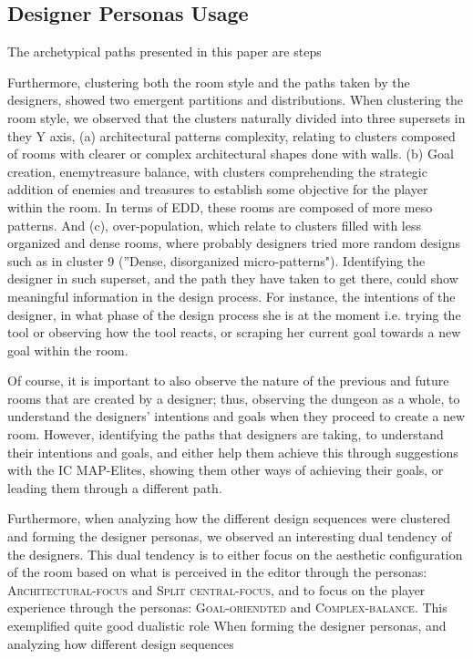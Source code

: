 \subsection{Designer Personas Usage}

The archetypical paths presented in this paper are steps 

Furthermore, clustering both the room style and the paths taken by the designers, showed two emergent partitions and distributions. When clustering the room style, we observed that the clusters naturally divided into three supersets in they Y axis, (a) architectural patterns complexity, relating to clusters composed of rooms with clearer or complex architectural shapes done with walls. (b) Goal creation, enemy\/treasure balance, with clusters comprehending the strategic addition of enemies and treasures to establish some objective for the player within the room. In terms of EDD, these rooms are composed of more meso patterns. And (c), over-population, which relate to clusters filled with less organized and dense rooms, where probably designers tried more random designs such as in cluster 9 (''Dense, disorganized micro-patterns"). Identifying the designer in such superset, and the path they have taken to get there, could show meaningful information in the design process. For instance, the intentions of the designer, in what phase of the design process she is at the moment i.e. trying the tool or observing how the tool reacts, or scraping her current goal towards a new goal within the room. 

Of course, it is important to also observe the nature of the previous and future rooms that are created by a designer; thus, observing the dungeon as a whole, to understand the designers' intentions and goals when they proceed to create a new room. However, identifying the paths that designers are taking, to understand their intentions and goals, and either help them achieve this through suggestions with the IC MAP-Elites, showing them other ways of achieving their goals, or leading them through a different path.

Furthermore, when analyzing how the different design sequences were clustered and forming the designer personas, we observed an interesting dual tendency of the designers. This dual tendency is to either focus on the aesthetic configuration of the room based on what is perceived in the editor through the personas: \textsc{Architectural-focus} and \textsc{Split central-focus}, and to focus on the player experience through the personas: \textsc{Goal-oriendted} and \textsc{Complex-balance}. This exemplified quite good 
dualistic role 
When forming the designer personas, and analyzing how different design sequences

